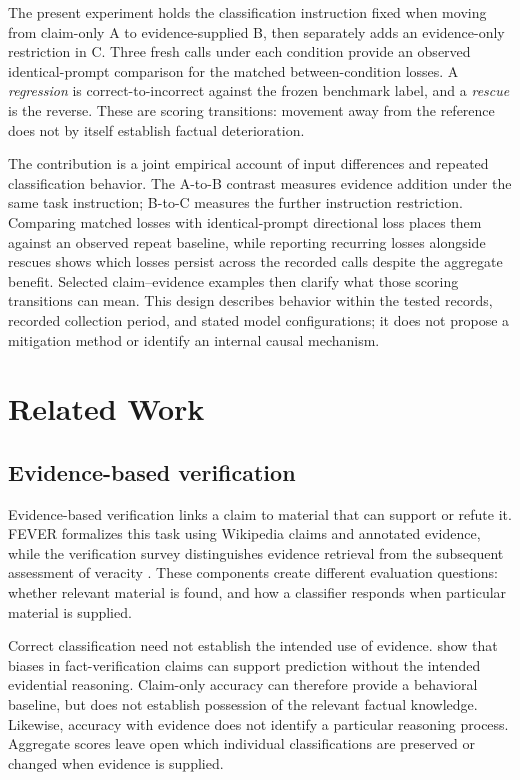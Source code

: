 \documentclass[11pt,letterpaper]{article}
\begin{document}
The present experiment holds the classification instruction fixed when moving from claim-only A to evidence-supplied B, then separately adds an evidence-only restriction in C. Three fresh calls under each condition provide an observed identical-prompt comparison for the matched between-condition losses. A \emph{regression} is correct-to-incorrect against the frozen benchmark label, and a \emph{rescue} is the reverse. These are scoring transitions: movement away from the reference does not by itself establish factual deterioration.

The contribution is a joint empirical account of input differences and repeated classification behavior. The A-to-B contrast measures evidence addition under the same task instruction; B-to-C measures the further instruction restriction. Comparing matched losses with identical-prompt directional loss places them against an observed repeat baseline, while reporting recurring losses alongside rescues shows which losses persist across the recorded calls despite the aggregate benefit. Selected claim--evidence examples then clarify what those scoring transitions can mean. This design describes behavior within the tested records, recorded collection period, and stated model configurations; it does not propose a mitigation method or identify an internal causal mechanism.

\section{Related Work}\label{sec:related}
\subsection{Evidence-based verification}
Evidence-based verification links a claim to material that can support or refute it. FEVER formalizes this task using Wikipedia claims and annotated evidence, while the verification survey distinguishes evidence retrieval from the subsequent assessment of veracity \citep{thorne-etal-2018-fever,guo-etal-2022-survey}. These components create different evaluation questions: whether relevant material is found, and how a classifier responds when particular material is supplied.

Correct classification need not establish the intended use of evidence. \citet{schuster-etal-2019-towards} show that biases in fact-verification claims can support prediction without the intended evidential reasoning. Claim-only accuracy can therefore provide a behavioral baseline, but does not establish possession of the relevant factual knowledge. Likewise, accuracy with evidence does not identify a particular reasoning process. Aggregate scores leave open which individual classifications are preserved or changed when evidence is supplied.
\end{document}
